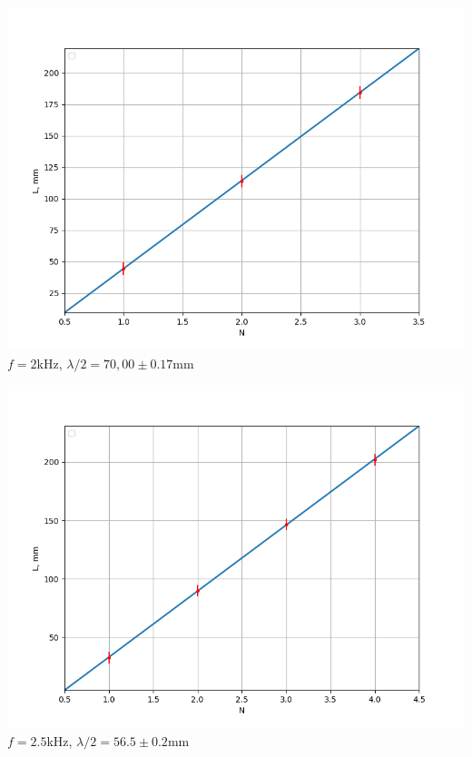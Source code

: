 \documentclass[12pt]{article}
\begin{document}
\begin{minipage}[t]{.49\textwidth}
	\vspace{0pt}
	\centering
	\includegraphics[scale = 0.45]{CO2_2.png}
	\small{$f = 2$kHz, $\lambda/2 = 70,00\pm0.17$mm}
\end{minipage}
\begin{minipage}[t]{.49\textwidth}
	\vspace{0pt}
	\centering
	\includegraphics[scale = 0.45]{CO2_3.png}
	\small{$f = 2.5$kHz, $\lambda/2 = 56.5\pm0.2$mm}
\end{minipage}
\end{document}
